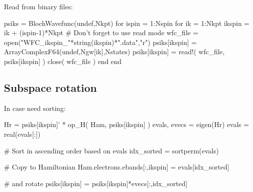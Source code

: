 Read from binary files:
\begin{juliacode}
psiks = BlochWavefunc(undef,Nkpt)
for ispin = 1:Nspin
for ik = 1:Nkpt
    ikspin = ik + (ispin-1)*Nkpt
    # Don't forget to use read mode
    wfc_file = open("WFC_ikspin_"*string(ikspin)*".data","r")
    psiks[ikspin] = Array{ComplexF64}(undef,Ngw[ik],Nstates)
    psiks[ikspin] = read!( wfc_file, psiks[ikspin] )
    close( wfc_file )
end
end
\end{juliacode}




\subsection*{Subspace rotation}

In case need sorting:

\begin{juliacode}
Hr = psiks[ikspin]' * op_H( Ham, psiks[ikspin] )
evals, evecs = eigen(Hr)
evals = real(evals[:])

# Sort in ascending order based on evals 
idx_sorted = sortperm(evals)

# Copy to Hamiltonian
Ham.electrons.ebands[:,ikspin] = evals[idx_sorted]

# and rotate
psiks[ikspin] = psiks[ikspin]*evecs[:,idx_sorted]
\end{juliacode}


